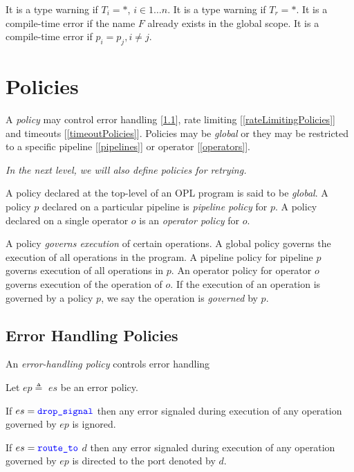\documentclass{article}
\begin{document}
It is a type warning if $T_i= *$, $i \in 1 \ldots n$.
It is a type warning if $T_r = *$.
It is a compile-time error if the name $F$ already exists in the global scope.
It is a compile-time error if $p_i = p_j, i \ne j$.

\section{Policies}
\label{policies}

A {\em policy} may control error handling [\ref{errorHandlingPolicies}], 
rate limiting [\ref{rateLimitingPolicies}] and timeouts  [\ref{timeoutPolicies}]. Policies may be  {\em global} or they may be restricted to a specific pipeline [\ref{pipelines}] or operator [\ref{operators}].

{\em In the next level, we will also define policies for retrying. }

\Policy{}

A  policy declared at the top-level of an OPL program is said to be {\em global}. A policy $p$ declared on a particular pipeline is {\em pipeline policy} for $p$. A policy declared on a single operator $o$ is an {\em operator policy} for $o$.

A  policy {\em governs execution} of certain operations. A global policy governs the execution of all operations in the program. A pipeline policy for pipeline $p$ governs execution of all operations in $p$. An operator policy for operator $o$ governs execution of the operation of $o$. If the execution of an operation is governed by a policy $p$, we say the operation is {\em governed} by $p$.

\subsection{Error Handling Policies}
\label{errorHandlingPolicies}

An {\em error-handling policy} controls error handling 

\ErrorPolicy{}
\ErrorStrategy{}
\ErrorAction{}

Let $ep \triangleq$ \POLICY{} \ERROR{} \STRATEGY{} $es$ be an error policy.

If $es = \texttt{\color{blue} drop\_signal}$ then any error signaled during execution of any operation governed by $ep$ is ignored.

If $es = \texttt{\color{blue} route\_to}$ $d$ then any error signaled during execution of any operation governed by $ep$ is directed to the port denoted by  $d$.
\end{document}
